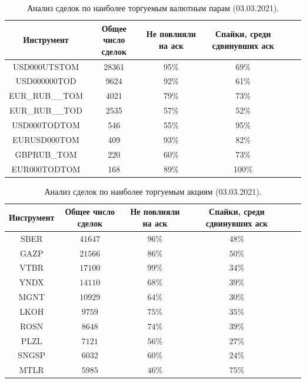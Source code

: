 \begin{table}[h!]
    \begin{center}
        \begin{tabular}{|c|c|c|c|c|c|}
            \hline
        Инструмент        & Общее число сделок & Не повлияли на аск & Спайки, среди сдвинувших аск \\ \hline
        USD000UTSTOM & 28361 &    95\% & 69\% \\ \hline
        USD000000TOD & 9624 &     92\% & 61\% \\ \hline
        EUR\_RUB\_\_TOM & 4021 &  79\% & 73\% \\ \hline
        EUR\_RUB\_\_TOD & 2535 &  57\% & 52\% \\ \hline
        USD000TODTOM & 546 &      55\% & 95\% \\ \hline
        EURUSD000TOM & 409 &      93\% & 82\% \\ \hline
        GBPRUB\_TOM & 220 &       60\% & 73\% \\ \hline
        EUR000TODTOM & 168 &      89\% & 100\%  \\ \hline
        \end{tabular}
    \end{center}
    \label{tableanalCU}
    \caption{Анализ сделок по наиболее торгуемым валютным парам (03.03.2021).}
\end{table} 

\begin{table}[h!]
    \begin{center}
        \begin{tabular}{|c|c|c|c|c|c|}
            \hline
        Инструмент   & Общее число сделок & Не повлияли на аск & Спайки, среди сдвинувших аск \\ \hline
        SBER &  $41647$  & $ 96\% $ &  $ 48\% $\\ \hline
        GAZP &  $21566$  & $ 86\% $  & $ 50\% $ \\ \hline
        VTBR &  $17100$  & $ 99\% $ &  $ 34\%$ \\ \hline
        YNDX &  $14110$  & $ 68\% $  & $ 39\% $ \\ \hline
        MGNT &  $10929$  & $ 64\% $  & $ 30\% $ \\ \hline
        LKOH &  $9759 $ &  $ 75\% $ &  $ 35\% $\\ \hline
        ROSN &  $8648 $ &  $ 74\% $ &  $ 39\%$ \\ \hline
        PLZL &  $7121 $ &  $ 56\% $ &  $ 27\% $\\ \hline
        SNGSP & $ 6032$  & $ 60\% $  & $ 24\% $ \\ \hline
        MTLR &  $5985 $ &  $ 46\% $ &  $ 75\%$\\ \hline
        \end{tabular}
    \end{center}
    \label{tableanalSE}
    \caption{Анализ сделок по наиболее торгуемым акциям (03.03.2021).}
\end{table} 



